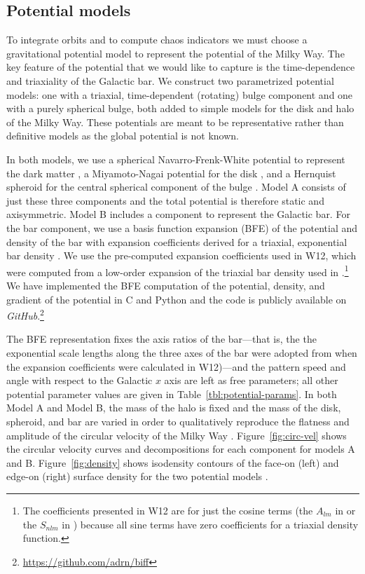 \documentclass[letterpaper,12pt,preprint]{aastex}
\newcommand{\project}[1]{\textsl{#1}}
\begin{document}
\subsection{Potential models}\label{sec:potential}

To integrate orbits and to compute chaos indicators we must choose a gravitational potential model to represent the potential of the Milky Way. The key feature of the potential that we would like to capture is the time-dependence and triaxiality of the Galactic bar. We construct two parametrized potential models: one with a triaxial, time-dependent (rotating) bulge component and one with a purely spherical bulge, both added to simple models for the disk and halo of the Milky Way. These potentials are meant to be representative rather than definitive models as the global potential is not known.

In both models, we use a spherical Navarro-Frenk-White potential to represent the dark matter \citep{navarro96}, a Miyamoto-Nagai potential for the disk \citep{miyamoto75}, and a Hernquist spheroid for the central spherical component of the bulge \citep{hernquist90}. Model A consists of just these three components and the total potential is therefore static and axisymmetric. Model B includes a component to represent the Galactic bar. For the bar component, we use a basis function expansion (BFE) of the potential and density of the bar with expansion coefficients derived for a triaxial, exponential bar density \citep[][hereafter W12]{wang12}. We use the pre-computed expansion coefficients used in W12, which were computed from a low-order expansion of the triaxial bar density used in \citet{dwek95}.\footnote{The coefficients presented in W12 are for just the cosine terms (the $A_{lm}$ in \citet{hernquist92} or the $S_{nlm}$ in \citet{lowing11}) because all sine terms have zero coefficients for a triaxial density function.} We have implemented the BFE computation of the potential, density, and gradient of the potential in C and Python and the code is publicly available on \project{GitHub}.\footnote{\url{https://github.com/adrn/biff}} 

The BFE representation fixes the axis ratios of the bar---that is, the the exponential scale lengths along the three axes of the bar were adopted from \cite{dwek95} when the expansion coefficients were calculated in W12)---and the pattern speed and angle with respect to the Galactic $x$ axis are left as free parameters; all other potential parameter values are given in Table~\ref{tbl:potential-params}. In both Model A and Model B, the mass of the halo is fixed and the mass of the disk, spheroid, and bar are varied in order to qualitatively reproduce the flatness and amplitude of the circular velocity of the Milky Way \citep{bovy12}. Figure~\ref{fig:circ-vel} shows the circular velocity curves and decompositions for each component for models A and B. Figure~\ref{fig:density} shows isodensity contours of the face-on (left) and edge-on (right) surface density for the two potential models \citep[compare to, e.g., Figure 3 in][]{portail15}. 
\end{document}
